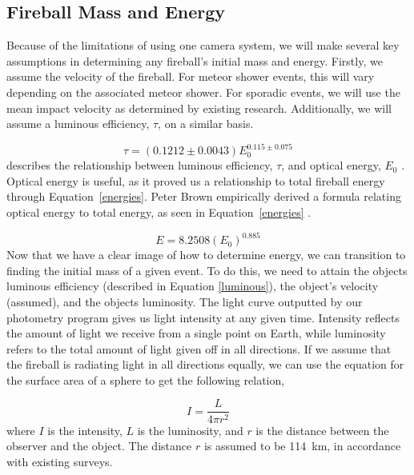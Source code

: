 \subsection{Fireball Mass and Energy}

Because of the limitations of using one camera system, we will make several key assumptions in determining any fireball's initial mass and energy.  
Firstly, we assume the velocity of the fireball.
For meteor shower events, this will vary depending on the associated meteor shower.
For sporadic events, we will use the mean impact velocity as determined by existing research.
Additionally, we will assume a luminous efficiency, $\tau$, on a similar basis.

\begin{equation}
 \tau = (0.1212 \pm 0.0043)E_0^{0.115 \pm 0.075} 
 \label{luminous}
\end{equation}
describes the relationship between luminous efficiency, $\tau$, and optical energy, $E_0$ \cite{brown_p_flux_2002}.
Optical energy is useful, as it proved us a relationship to total fireball energy through Equation~\ref{energies}.
Peter Brown empirically derived a formula relating optical energy to total energy, as seen in Equation~\ref{energies} \cite{brown_p_flux_2002}.

\begin{equation}
E = 8.2508(E_0)^{0.885}
 \label{energies}
\end{equation}
Now that we have a clear image of how to determine energy, we can transition to finding the initial mass of a given event.
To do this, we need to attain the objects luminous efficiency (described in Equation \ref{luminous}), the object's velocity (assumed), and the objects luminosity.
The light curve outputted by our photometry program gives us light intensity at any given time.
Intensity reflects the amount of light we receive from a single point on Earth, while luminosity refers to the total amount of light given off in all directions.
If we assume that the fireball is radiating light in all directions equally, we can use the equation for the surface area of a sphere to get the following relation,

\begin{equation}
 I = \frac{L}{4 \pi r^2}
\label{intensity}
\end{equation}
where $I$ is the intensity, $L$ is the luminosity, and $r$ is the distance between the observer and the object. 
The distance $r$ is assumed to be \SI{114}{\kilo\meter}, in accordance with existing surveys.


